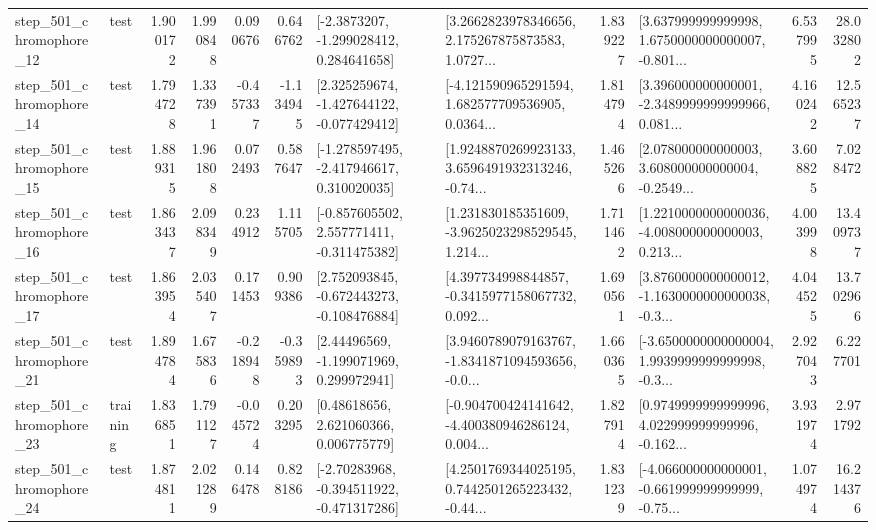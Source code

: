 \begin{tabular}{llrrrrllrlrr}
  step\_501\_chromophore\_12 &      test &      1.900172 &    1.990848 &      0.090676 &  0.646762 &     [-2.3873207, -1.299028412, 0.284641658] &  [3.2662823978346656, 2.175267875873583, 1.0727... &       1.839227 &  [3.637999999999998, 1.6750000000000007, -0.801... &            6.537995 &         28.032802 \\
  step\_501\_chromophore\_14 &      test &      1.794728 &    1.337391 &     -0.457337 & -1.134945 &   [2.325259674, -1.427644122, -0.077429412] &  [-4.121590965291594, 1.682577709536905, 0.0364... &       1.814794 &  [3.396000000000001, -2.3489999999999966, 0.081... &            4.160242 &         12.565237 \\
  step\_501\_chromophore\_15 &      test &      1.889315 &    1.961808 &      0.072493 &  0.587647 &   [-1.278597495, -2.417946617, 0.310020035] &  [1.9248870269923133, 3.6596491932313246, -0.74... &       1.465266 &  [2.078000000000003, 3.608000000000004, -0.2549... &            3.608825 &          7.028472 \\
  step\_501\_chromophore\_16 &      test &      1.863437 &    2.098349 &      0.234912 &  1.115705 &   [-0.857605502, 2.557771411, -0.311475382] &  [1.231830185351609, -3.9625023298529545, 1.214... &       1.711462 &  [1.2210000000000036, -4.008000000000003, 0.213... &            4.003998 &         13.409737 \\
  step\_501\_chromophore\_17 &      test &      1.863954 &    2.035407 &      0.171453 &  0.909386 &   [2.752093845, -0.672443273, -0.108476884] &  [4.397734998844857, -0.3415977158067732, 0.092... &       1.690561 &  [3.8760000000000012, -1.1630000000000038, -0.3... &            4.044525 &         13.702966 \\
  step\_501\_chromophore\_21 &      test &      1.894784 &    1.675836 &     -0.218948 & -0.359893 &     [2.44496569, -1.199071969, 0.299972941] &  [3.9460789079163767, -1.8341871094593656, -0.0... &       1.660365 &  [-3.6500000000000004, 1.9939999999999998, -0.3... &            2.927043 &          6.227701 \\
  step\_501\_chromophore\_23 &  training &      1.836851 &    1.791127 &     -0.045724 &  0.203295 &      [0.48618656, 2.621060366, 0.006775779] &  [-0.904700424141642, -4.400380946286124, 0.004... &       1.827914 &  [0.9749999999999996, 4.022999999999996, -0.162... &            3.931974 &          2.971792 \\
  step\_501\_chromophore\_24 &      test &      1.874811 &    2.021289 &      0.146478 &  0.828186 &   [-2.70283968, -0.394511922, -0.471317286] &  [4.2501769344025195, 0.7442501265223432, -0.44... &       1.831239 &  [-4.066000000000001, -0.661999999999999, -0.75... &            1.074974 &         16.214376 \\

\end{tabular}
